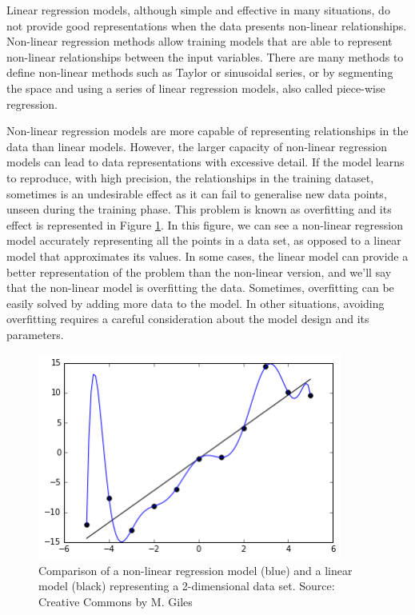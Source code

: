 \medskip

Linear regression models, although simple and effective in many situations, do not provide good representations when the data presents non-linear relationships. Non-linear regression methods allow training models that are able to represent non-linear relationships between the input variables. There are many methods to define non-linear methods such as Taylor or sinusoidal series, or by segmenting the space and using a series of linear regression models, also called piece-wise regression.

\medskip

Non-linear regression models are more capable of representing relationships in the data than linear models. However, the larger capacity of non-linear regression models can lead to data representations with excessive detail. If the model learns to reproduce, with high precision, the relationships in the training dataset, sometimes is an undesirable effect as it can fail to generalise new data points, unseen during the training phase. This problem is known as overfitting \citep{hawkins2004problem} and its effect is represented in Figure \ref{overfitting}. In this figure, we can see a non-linear regression model accurately representing all the points in a data set, as opposed to a linear model that approximates its values. In some cases, the linear model can provide a better representation of the problem than the non-linear version, and we'll say that the non-linear model is overfitting the data. Sometimes, overfitting can be easily solved by adding more data to the model. In other situations, avoiding overfitting requires a careful consideration about the model design and its parameters.

\medskip

\begin{figure}[h]
 \centerline{\includegraphics[width=10cm]{overfitting.png}} \caption{Comparison of a non-linear regression model (blue) and a linear model (black) representing a 2-dimensional data set. Source: Creative Commons by M. Giles}\label{overfitting}
\end{figure}

